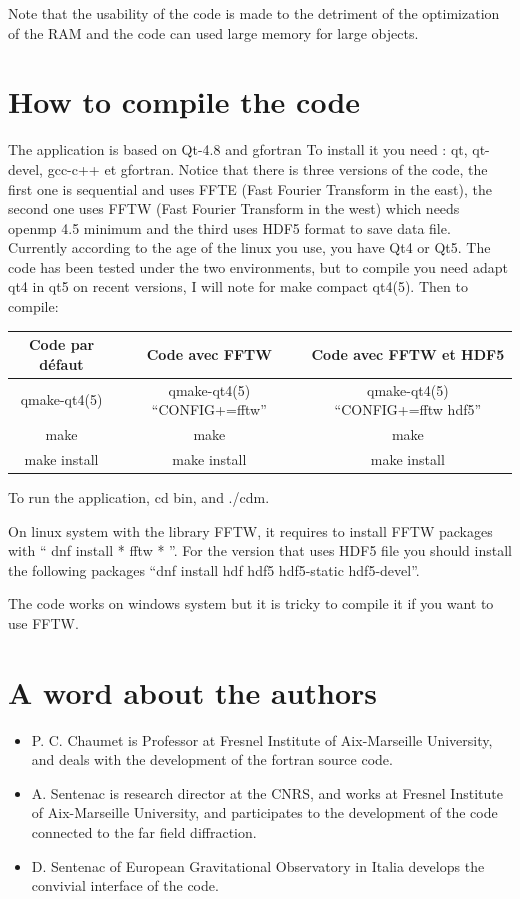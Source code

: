 Note that the usability of the code is made to the detriment of the
optimization of the RAM and the code can used large memory for large
objects.


\section{How to compile the code}
The application is based on Qt-4.8 and gfortran To install it you need
: qt, qt-devel, gcc-c++ et gfortran.  Notice that there is three
versions of the code, the first one is sequential and uses FFTE (Fast
Fourier Transform in the east), the second one uses FFTW (Fast Fourier
Transform in the west) which needs openmp 4.5 minimum and the third
uses HDF5 format to save data file.  Currently according to the age of
the linux you use, you have Qt4 or Qt5. The code has been tested under
the two environments, but to compile you need adapt qt4 in qt5 on
recent versions, I will note for make compact qt4(5). Then to compile:

\begin{tabular}{|c|c|c|}
  \hline
  Code par défaut & Code avec FFTW & Code avec FFTW et HDF5 \\
  \hline
  qmake-qt4(5) & qmake-qt4(5) ``CONFIG+=fftw'' & qmake-qt4(5) ``CONFIG+=fftw hdf5'' \\
  make & make & make \\
make install & make install & make install \\
  \hline
\end{tabular}

To run the application, cd bin, and ./cdm.


On linux system with the library FFTW, it requires to install FFTW
packages with `` dnf install * fftw * ''. For the version that uses
HDF5 file you should install the following packages ``dnf install hdf
hdf5 hdf5-static hdf5-devel''.

The code works on windows system but it is tricky to compile it if you
want to use FFTW.

\section{A word about the authors}

\begin{itemize}
\item P. C. Chaumet is Professor at Fresnel Institute of Aix-Marseille
  University, and deals with the development of the fortran source
  code.
\item A. Sentenac is research director at the CNRS, and works at
  Fresnel Institute of Aix-Marseille University, and participates to
  the development of the code connected to the far field diffraction.
\item D. Sentenac of European Gravitational Observatory in Italia
  develops the convivial interface of the code.
\end{itemize}

